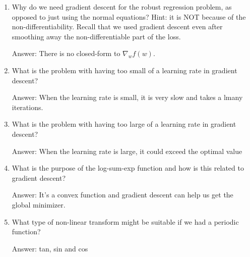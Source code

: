 \documentclass{article}
\def\ans#1{\par\gre{Answer: #1}}
\def\gre#1{{\color{gre}#1}}
\begin{document}
\begin{enumerate}
\ans{It means the ocal minimizer is also a global minimizer.
No, for  l1-norm, it is convex but not differentiable at 0.}
\item Why do we need gradient descent for the robust regression problem, as opposed to just using the normal equations? Hint: it is NOT because of the non-differentiability. Recall that we used gradient descent even after smoothing away the non-differentiable part of the loss.
\ans{There is no closed-form to $\nabla_wf(w)$.}
\item What is the problem with having too small of a learning rate in gradient descent?
\ans{When the learning rate is small, it is very slow and takes a lmany iterations.}
\item What is the problem with having too large of a learning rate in gradient descent?
\ans{When the learning rate is large, it could exceed the optimal value}
\item What is the purpose of the log-sum-exp function and how is this related to gradient descent?
\ans{It's a convex function and gradient descent can help us get the global minimizer.}
\item What type of non-linear transform might be suitable if we had a periodic function?
\ans{tan, sin and cos}
\end{enumerate}
\end{document}
